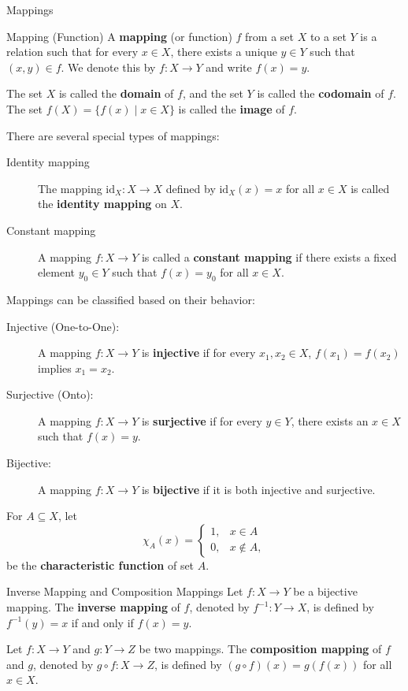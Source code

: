 \begin{leftbarTitle}{Mappings}\end{leftbarTitle}
\begin{definition}{Mapping (Function)} %
    A \textbf{mapping} (or function) \(f\) from a set \(X\) to a set \(Y\) is a relation 
    such that for every \(x \in X\), there exists a unique \(y \in Y\) such that \((x, y) \in f\).
    We denote this by \(f: X \to Y\) and write \(f(x) = y\).

    The set \(X\) is called the \textbf{domain} of \(f\), and the set \(Y\) is called the \textbf{codomain} of \(f\).
    \newline The set \(f(X) = \{f(x) \mid x \in X\}\) is called the \textbf{image} of \(f\).
\end{definition}
There are several special types of mappings:
\begin{description}
    \item[Identity mapping] The mapping \(\mathrm{id}_X: X \to X\) defined by \(\mathrm{id}_X(x) = x\) for all \(x \in X\) 
        is called the \textbf{identity mapping} on \(X\).
    \item[Constant mapping] A mapping \(f: X \to Y\) is called a \textbf{constant mapping} 
        if there exists a fixed element \(y_0 \in Y\) such that \(f(x) = y_0\) for all \(x \in X\).
\end{description}
Mappings can be classified based on their behavior:
\begin{description}
    \item[Injective (One-to-One):] A mapping \(f: X \to Y\) is \textbf{injective} 
        if for every \(x_1, x_2 \in X\), \(f(x_1) = f(x_2)\) implies \(x_1 = x_2\).
    \item[Surjective (Onto):] A mapping \(f: X \to Y\) is \textbf{surjective} 
        if for every \(y \in Y\), there exists an \(x \in X\) such that \(f(x) = y\).
    \item[Bijective:] A mapping \(f: X \to Y\) is \textbf{bijective} 
        if it is both injective and surjective.
\end{description}

For \(A\subseteq X\), let
\[
\chi_A(x) =
\begin{cases} 
    1, & x\in A \\
    0, & x \notin A ,
\end{cases}
\]
be the \textbf{characteristic function} of set \(A\).


\begin{definition}{Inverse Mapping and Composition Mappings} %
    Let \(f: X \to Y\) be a bijective mapping. 
    The \textbf{inverse mapping} of \(f\), denoted by \(f^{-1}: Y \to X\), 
    is defined by \(f^{-1}(y) = x\) if and only if \(f(x) = y\).
    
    Let \(f: X \to Y\) and \(g: Y \to Z\) be two mappings. 
    The \textbf{composition mapping} of \(f\) and \(g\), denoted by \(g \circ f: X \to Z\), 
    is defined by \((g \circ f)(x) = g(f(x))\) for all \(x \in X\).
\end{definition}

